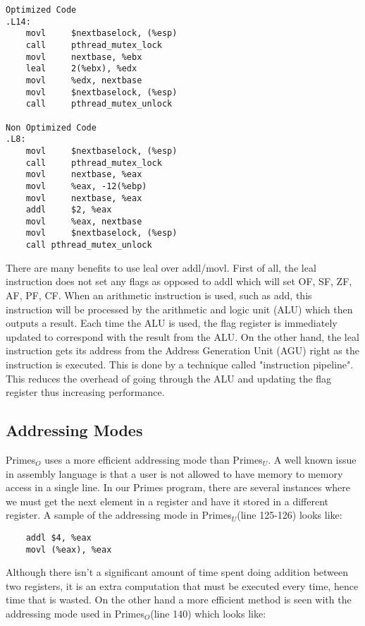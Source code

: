 \documentclass[11pt]{article}
\begin{document}
\begin{verbatim}
Optimized Code
.L14:
    movl	 $nextbaselock, (%esp)
    call	 pthread_mutex_lock
    movl	 nextbase, %ebx
    leal	 2(%ebx), %edx
    movl	 %edx, nextbase
    movl	 $nextbaselock, (%esp)
    call	 pthread_mutex_unlock
	
Non Optimized Code
.L8:
    movl	 $nextbaselock, (%esp)
    call	 pthread_mutex_lock
    movl	 nextbase, %eax         
    movl	 %eax, -12(%ebp)        
    movl	 nextbase, %eax         
    addl	 $2, %eax
    movl	 %eax, nextbase
    movl	 $nextbaselock, (%esp)
    call pthread_mutex_unlock
\end{verbatim}

There are many benefits to use leal over addl/movl. First of all, the leal instruction does not set any flags as opposed to addl which will set OF, SF, ZF, AF, PF, CF. When an arithmetic instruction is used, such as add, this instruction will be processed by the arithmetic and logic unit (ALU) which then outputs a result. Each time the ALU is used, the flag register is immediately updated to correspond with the result from the ALU. On the other hand, the leal instruction gets its address from the Address Generation Unit (AGU) right as the instruction is executed. This is done by a technique called "instruction pipeline". This reduces the overhead of going through the ALU and updating the flag register thus increasing performance.
\subsection{Addressing Modes}

Primes$_{O}$ uses a more efficient addressing mode than Primes$_{U}$. A well known issue in assembly language is that a user is not allowed to have memory to memory access in a single line. In our Primes program, there are several instances where we must get the next element in a register and have it stored in a different register. A sample of the addressing mode in Primes$_{U}$(line 125-126) looks like:

\begin{verbatim}
    addl $4, %eax
    movl (%eax), %eax 
\end{verbatim}

Although there isn't a significant amount of time spent doing addition between two registers, it is an extra computation that must be executed every time, hence time that is wasted. On the other hand a more efficient method is seen with the addressing mode used in Primes$_{O}$(line 140) which looks like: 
\end{document}

